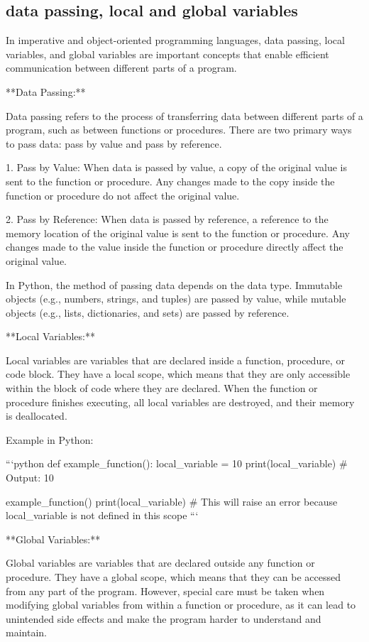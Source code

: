 \documentclass{article}
\begin{document}
\subsection{data passing, local and global variables}

In imperative and object-oriented programming languages, data passing, local variables, and global variables are important concepts that enable efficient communication between different parts of a program.

**Data Passing:**

Data passing refers to the process of transferring data between different parts of a program, such as between functions or procedures. There are two primary ways to pass data: pass by value and pass by reference.

1. Pass by Value: When data is passed by value, a copy of the original value is sent to the function or procedure. Any changes made to the copy inside the function or procedure do not affect the original value.

2. Pass by Reference: When data is passed by reference, a reference to the memory location of the original value is sent to the function or procedure. Any changes made to the value inside the function or procedure directly affect the original value.

In Python, the method of passing data depends on the data type. Immutable objects (e.g., numbers, strings, and tuples) are passed by value, while mutable objects (e.g., lists, dictionaries, and sets) are passed by reference.

**Local Variables:**

Local variables are variables that are declared inside a function, procedure, or code block. They have a local scope, which means that they are only accessible within the block of code where they are declared. When the function or procedure finishes executing, all local variables are destroyed, and their memory is deallocated.

Example in Python:

```python
def example_function():
    local_variable = 10
    print(local_variable)  # Output: 10

example_function()
print(local_variable)  # This will raise an error because local_variable is not defined in this scope
```

**Global Variables:**

Global variables are variables that are declared outside any function or procedure. They have a global scope, which means that they can be accessed from any part of the program. However, special care must be taken when modifying global variables from within a function or procedure, as it can lead to unintended side effects and make the program harder to understand and maintain.
\end{document}
